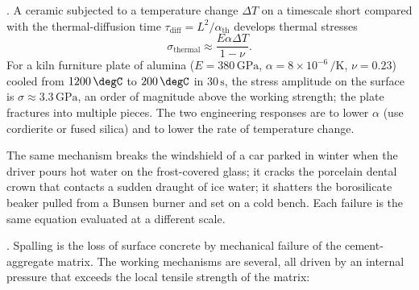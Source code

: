 . A ceramic subjected to a temperature change
$\Delta T$ on a timescale short compared with the thermal-diffusion
time $\tau_{\text{diff}} = L^2/\alpha_{\text{th}}$ develops thermal
stresses
\[
\sigma_{\text{thermal}} \approx \frac{E \alpha \Delta T}{1 - \nu}.
\]
For a kiln furniture plate of alumina ($E = 380\,\text{GPa}$,
$\alpha = 8 \times 10^{-6}\,\si{\per\kelvin}$, $\nu = 0.23$) cooled
from $1200\,\degC$ to $200\,\degC$ in $30\,\text{s}$, the stress
amplitude on the surface is $\sigma \approx 3.3\,\text{GPa}$, an order
of magnitude above the working strength; the plate fractures into
multiple pieces. The two engineering responses are to lower
$\alpha$ (use cordierite or fused silica) and to lower the rate of
temperature change.

The same mechanism breaks the windshield of a car parked in winter
when the driver pours hot water on the frost-covered glass; it
cracks the porcelain dental crown that contacts a sudden draught of
ice water; it shatters the borosilicate beaker pulled from a Bunsen
burner and set on a cold bench. Each failure is the same equation
evaluated at a different scale.

. Spalling is the loss of surface concrete
by mechanical failure of the cement-aggregate matrix. The working
mechanisms are several, all driven by an internal pressure that
exceeds the local tensile strength of the matrix:

